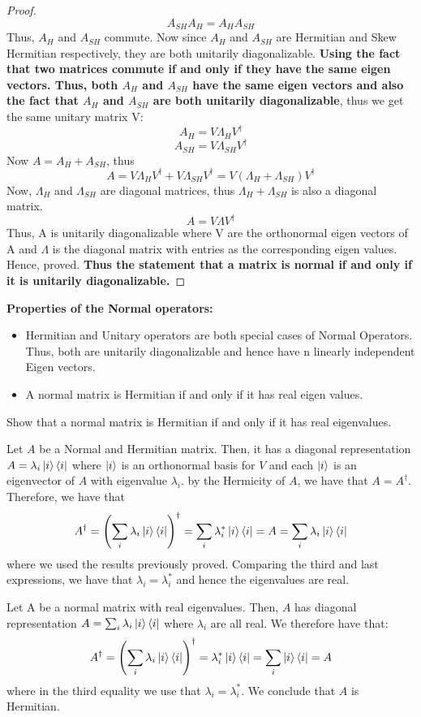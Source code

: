 \begin{proof}
    \[A_{SH}A_H=A_HA_{SH}\]
    Thus, $A_H$ and $A_{SH}$ commute. Now since $A_H$ and $A_{SH}$ are Hermitian and Skew Hermitian respectively, they are both unitarily diagonalizable.
    \textbf{Using the fact that two matrices commute if and only if they have the same eigen vectors. Thus, both $A_H$ and $A_{SH}$ have the same eigen vectors and also the fact that 
    $A_H$ and $A_{SH}$ are both unitarily diagonalizable}, thus we get the same
    unitary matrix V:
    \[ A_H=V\Lambda_H V^{\dagger} \]
    \[ A_{SH}=V\Lambda_{SH} V^{\dagger} \]
    Now $A=A_H+A_{SH}$, thus
    \[ A=V\Lambda_H V^{\dagger} + V\Lambda_{SH} V^{\dagger} = V(\Lambda_H + \Lambda_{SH})V^{\dagger} \]
    Now, $\Lambda_H$ and $\Lambda_{SH}$ are diagonal matrices, thus $\Lambda_H + \Lambda_{SH}$ is also a diagonal matrix.
    \[ A = V\Lambda V^{\dagger} \]
    Thus, A is unitarily diagonalizable where V are the orthonormal eigen vectors of A and $\Lambda$ is the diagonal matrix
    with entries as the corresponding eigen values. Hence, proved.
    \textbf{Thus the statement that a matrix is normal if and only if it is unitarily diagonalizable.}
\end{proof}
\textbf{Properties of the Normal operators: }
\begin{itemize}
    \item Hermitian and Unitary operators are both special cases of Normal Operators. Thus, both are unitarily 
    diagonalizable and hence have n linearly independent Eigen vectors.
    \item A normal matrix is Hermitian if and only if it has real eigen values.
\end{itemize}
\begin{example}
    Show that a normal matrix is Hermitian if and only if it has real eigenvalues.

    Let $A$ be a Normal and Hermitian matrix. Then, it has a diagonal representation $A=\lambda_i\ket{i}\bra{i}$ where $\ket{i}$ is an orthonormal basis for $V$ and each $\ket{i}$ is an eigenvector of $A$ with eigenvalue $\lambda_i$. by the Hermicity of $A$, we have that $A=A^{\dagger}$. Therefore, we have that
    \[
    A^{\dagger}=\left(\sum_i \lambda_i \ket{i}\bra{i}\right)^{\dagger}=\sum_i \lambda_i^* \ket{i}\bra{i}=A=\sum_i \lambda_i \ket{i}\bra{i}
    \]
    where we used the results previously proved. Comparing the third and last expressions, we have that $\lambda_i=\lambda_i^*$ and hence the eigenvalues are real.

    Let A be a normal matrix with real eigenvalues. Then, $A$ has diagonal representation $A=\sum_i \lambda_i \ket{i}\bra{i}$ where $\lambda_i$ are all real. We therefore have that:
\[
A^{\dagger}=\left(\sum_i \lambda_i \ket{i}\bra{i}\right)^{\dagger}=\lambda_i^* \ket{i}\bra{i}=\sum_i \ket{i}\bra{i}=A
\]
where in the third equality we use that $\lambda_i=\lambda_i^*$. We conclude that $A$ is Hermitian.
\end{example}
